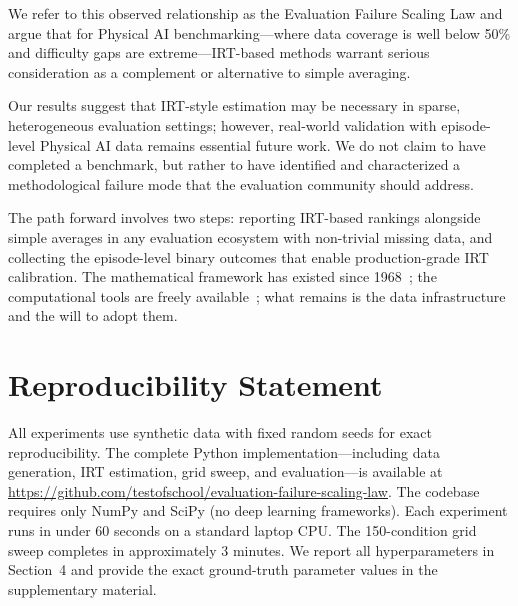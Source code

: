 \documentclass[11pt,a4paper]{article}
\begin{document}
We refer to this observed relationship as the Evaluation Failure Scaling Law and argue that for Physical AI benchmarking---where data coverage is well below 50\% and difficulty gaps are extreme---IRT-based methods warrant serious consideration as a complement or alternative to simple averaging.

Our results suggest that IRT-style estimation may be necessary in sparse, heterogeneous evaluation settings; however, real-world validation with episode-level Physical AI data remains essential future work. We do not claim to have completed a benchmark, but rather to have identified and characterized a methodological failure mode that the evaluation community should address.

The path forward involves two steps: reporting IRT-based rankings alongside simple averages in any evaluation ecosystem with non-trivial missing data, and collecting the episode-level binary outcomes that enable production-grade IRT calibration. The mathematical framework has existed since 1968~\cite{lord1968}; the computational tools are freely available~\cite{lalor2022,rodriguez2021b}; what remains is the data infrastructure and the will to adopt them.

\section*{Reproducibility Statement}

All experiments use synthetic data with fixed random seeds for exact reproducibility. The complete Python implementation---including data generation, IRT estimation, grid sweep, and evaluation---is available at \url{https://github.com/testofschool/evaluation-failure-scaling-law}. The codebase requires only NumPy and SciPy (no deep learning frameworks). Each experiment runs in under 60 seconds on a standard laptop CPU. The 150-condition grid sweep completes in approximately 3 minutes. We report all hyperparameters in Section~4 and provide the exact ground-truth parameter values in the supplementary material.


\end{document}
